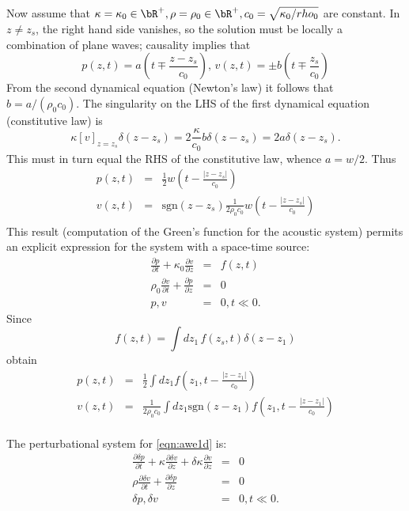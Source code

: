 Now assume that $\kappa=\kappa_0 \in \bR^+, \rho=\rho_0 \in \bR^+, c_0
= \sqrt{\kappa_0/rho_0}$ are constant. 
In $z \ne z_s$, the right hand side 
vanishes, so the solution must be locally a combination of plane
waves; causality implies that
\[
p(z,t)=a\left(t \mp \frac{z-z_s}{c_0}\right), \, v(z,t)=\pm b\left(t \mp
  \frac{z_s}{c_0}\right)
\]
From the second dynamical equation (Newton's law) it follows that $b =
a/(\rho_0 c_0)$. The singularity on the LHS of the first dynamical
equation (constitutive law) is
\[
\kappa [v]_{z=z_s}\delta(z-z_s) =
2\frac{\kappa}{c_0}b\delta(z-z_s) = 2a\delta(z-z_s).
\] 
This must in turn equal the RHS of the constitutive law, whence
$a=w/2$. Thus
\begin{eqnarray}
\label{eqn:sol1dptsrc}
p(z,t) &=& \frac{1}{2}w\left(t - \frac{|z-z_s|}{c_0}\right) \nonumber \\
v(z,t) &=& \mbox{sgn}(z-z_s)\frac{1}{2\rho_0 c_0}w\left(t -\frac{|z-z_s|}{c_0}\right)
           \nonumber \\
\end{eqnarray}
This result (computation of the Green's function for the acoustic
system) permits an explicit expression for the system with a
space-time source:
\begin{eqnarray}
\label{eqn:awe1d}
\frac{\partial p}{\partial t} +\kappa_0\frac{\partial 
  v}{\partial z} &=& f(z,t) \nonumber\\
\rho_0 \frac{\partial v}{\partial t} + \frac{\partial p}{\partial 
  z}&=&0\nonumber\\
 p,v&=&0, t \ll 0. 
\end{eqnarray}
Since
\[
  f(z,t) = \int dz_1\,f(z_s,t)\delta(z-z_1)
\]
obtain
\begin{eqnarray}
\label{eqn:sol1d}
p(z,t) &=& \frac{1}{2}\int dz_1 f\left(z_1,t - \frac{|z-z_1|}{c_0}\right) \\
v(z,t) &=& \frac{1}{2\rho_0 c_0} \int dz_1 \mbox{sgn} (z-z_1) f\left(z_1,t - \frac{|z-z_1|}{c_0}\right)\\
\end{eqnarray}


The perturbational system for \ref{eqn:awe1d} is:
\begin{eqnarray}
\label{eqn:dawe1d}
\frac{\partial \delta p}{\partial t} +\kappa\frac{\partial
  \delta v}{\partial z} + \delta \kappa\frac{\partial
  v}{\partial z} &=& 0 \nonumber\\
\rho \frac{\partial \delta v}{\partial t} + \frac{\partial \delta p}{\partial
  z}&=&0\nonumber\\
\delta p,\delta v&=&0, t \ll 0.
\end{eqnarray}

